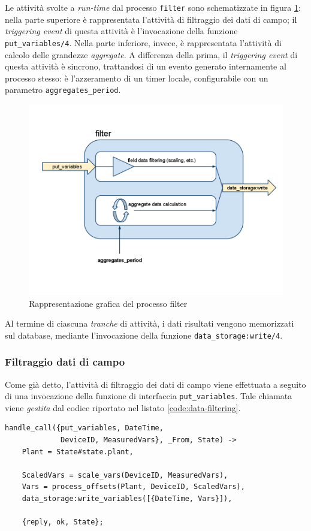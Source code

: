 %
Le attivit\`a svolte a \emph{run-time} dal processo \texttt{filter} sono schematizzate in 
figura \ref{filter}: nella parte superiore \`e rappresentata l'attivit\`a di filtraggio 
dei dati di campo; il \emph{triggering event} di questa attivit\`a \`e l'invocazione della 
funzione \texttt{put\_variables/4}.
%
Nella parte inferiore, invece, \`e rappresentata l'attivit\`a di calcolo delle grandezze 
\emph{aggregate}. A differenza della prima, il \emph{triggering event} di questa attivit\`a
\`e sincrono, trattandosi di un evento generato internamente al processo stesso: 
\`e l'azzeramento di un timer locale, configurabile con un parametro \texttt{aggregates\_period}.
%

%
\begin{figure}[!h]
\centering
\includegraphics[width=380pt]{img/filter.png}
\caption{Rappresentazione grafica del processo filter}
\label{filter}
\end{figure}
%
Al termine di ciascuna \emph{tranche} di attivit\`a, i dati risultati vengono memorizzati sul 
database, mediante l'invocazione della funzione \texttt{data\_storage:write/4}.
%

%
\subsubsection{Filtraggio dati di campo}
%
Come gi\`a detto, l'attivit\`a di filtraggio dei dati di campo viene effettuata a seguito 
di una invocazione della funzione di interfaccia \texttt{put\_variables}. Tale chiamata viene
\emph{gestita} dal codice riportato nel listato \ref{code:data-filtering}.
%
\begin{lstlisting}[caption={Filtraggio dei dati di campo}, label={code:data-filtering},frame=trBL]
handle_call({put_variables, DateTime, 
             DeviceID, MeasuredVars}, _From, State) ->
    Plant = State#state.plant,

    ScaledVars = scale_vars(DeviceID, MeasuredVars),
    Vars = process_offsets(Plant, DeviceID, ScaledVars),
    data_storage:write_variables([{DateTime, Vars}]),

    {reply, ok, State};
\end{lstlisting}
%

